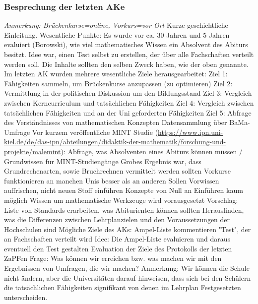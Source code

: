 		\subsubsection*{Besprechung der letzten AKe}
			\begin{outline}
				\1 \textit{Anmerkung: Brückenkurse=online, Vorkurs=vor Ort}
				\1 Kurze geschichtliche Einleitung. Wesentliche Punkte:
					\2 Es wurde vor ca. 30 Jahren und 5 Jahren evaluiert (Borowski), wie viel mathematisches Wissen ein Absolvent des Abiturs besitzt.
					\2 Idee war, einen Test selbst zu erstellen, der über alle Fachschaften verteilt werden soll. Die Inhalte sollten den selben Zweck haben, wie der oben genannte.
					\2 Im letzten AK wurden mehrere wesentliche Ziele herausgearbeitet:
						\3 Ziel 1: Fähigkeiten sammeln, um Brückenkurse anzupassen (zu optimieren)
						\3 Ziel 2: Vermittlung in der politischen Diskussion um den Bildungsstand
						\3 Ziel 3: Vergleich zwischen Kerncurriculum und tatsächlichen Fähigkeiten
						\3 Ziel 4: Vergleich zwischen tatsächlichen Fähigkeiten und an der Uni geforderten Fähigkeiten
						\3 Ziel 5: Abfrage des Verständnisses von mathematischen Konzepten
				\1 Datensammlung über BaMa-Umfrage
				\1 Vor kurzem veröffentliche MINT Studie (\url{https://www.ipn.uni-kiel.de/de/das-ipn/abteilungen/didaktik-der-mathematik/forschung-und-projekte/malemint}):
					\2 Abfrage, was Absolventen eines Abiturs können müssen / Grundwissen für MINT-Studiengänge
					\2 Grobes Ergebnis war, dass Grundrechenarten, sowie Bruchrechnen vermittelt werden sollten
				\1 Vorkurse funktionieren an manchen Unis besser als an anderen
					\2 Sollen Vorwissen auffrischen, nicht neuen Stoff einführen
					\2 Konzepte von Null an Einführen kaum möglich
					\2 Wissen um mathematische Werkzeuge wird vorausgesetzt
				\1 Vorschlag: Liste von Standards erarbeiten, was Abiturienten können sollten
				\1 Herausfinden, was die Differenzen zwischen Lehrplanzielen und den Voraussetzungen der Hochschulen sind
				\1 Mögliche Ziele des AKs:
					\2 Ampel-Liste kommentieren
					\2 "Test", der an Fachschaften verteilt wird
				\1 Idee: Die Ampel-Liste evaluieren und daraus eventuell den Test gestalten
				\1 Evaluation der Ziele des Protokolls der letzten ZaPFen
				\1 Frage: Was können wir erreichen bzw. was machen wir mit den Ergebnissen von Umfragen, die wir machen?
				\1 Anmerkung: Wir können die Schule nicht ändern, aber die Universitäten darauf hinweisen, dass sich bei den Schülern die tatsächlichen Fähigkeiten signifikant von denen im Lehrplan Festgesetzten unterscheiden.
			\end{outline}

